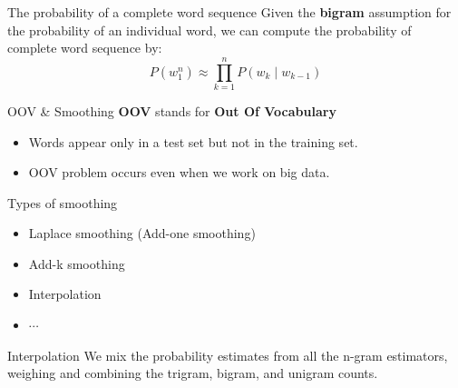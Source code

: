 \documentclass{beamer}
\begin{document}

\begin{frame}{The probability of a complete word sequence}
    Given the \textbf{bigram} assumption for the probability of an individual word, we can compute the probability of complete word sequence by:
    $$P(w_1^n) \approx \prod_{k=1}^nP(w_k\mid w_{k-1})$$


\end{frame}


\begin{frame}{OOV \& Smoothing}
    \textbf{OOV} stands for \textbf{Out Of Vocabulary}\\
    \begin{itemize}
        \item Words appear only in a test set but not in the training set.
        \item OOV problem occurs even when we work on big data.
    \end{itemize}
\end{frame}

\begin{frame}{Types of smoothing}
    \begin{itemize}
        \item Laplace smoothing (Add-one smoothing)
        \item Add-k smoothing
        \item Interpolation
        \item $\cdots$
    \end{itemize}
    \begin{block}{Interpolation}
        We mix the probability estimates from all the n-gram estimators, weighing and combining the trigram, bigram, and unigram counts.
    \end{block}
\end{frame}
\end{document}
